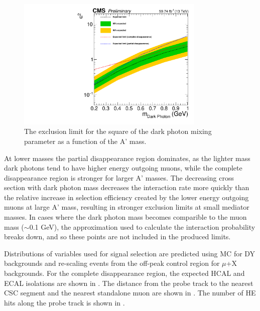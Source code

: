 \begin{figure}[htbp]
	\centering
	\includegraphics[width=0.8\textwidth]{figures/Limit_AllRegions.pdf}
	\caption[Exclusion Limits on the Dark Photon Mixing Parameter]{The exclusion limit for the square of the dark photon mixing parameter as a function of the A' mass.}
	\label{fig:limits}
\end{figure}

At lower masses the partial disappearance region dominates, as the lighter mass dark photons tend to have higher energy outgoing muons, while the complete disappearance region is stronger for larger A' masses. 
The decreasing cross section with dark photon mass decreases the interaction rate more quickly than the relative increase in selection efficiency created by the lower energy outgoing muons at large A' mass, resulting in stronger exclusion limits at small mediator masses. 
In cases where the dark photon mass becomes comparible to the muon mass ($\sim$0.1 GeV), the \ww approximation used to calculate the interaction probability breaks down, and so these points are not included in the produced limits.

Distributions of variables used for signal selection are predicted using MC for DY backgrounds and re-scaling events from the off-peak control region for $\mu$+X backgrounds.
For the complete disappearance region, the expected HCAL and ECAL isolations are shown in . 
The distance from the probe track to the nearest CSC segment and the nearest standalone muon are shown in .
The number of HE hits along the probe track is shown in .

